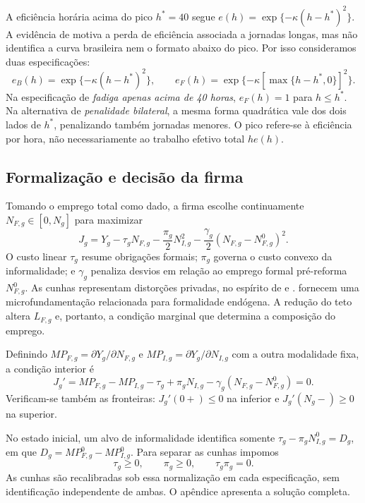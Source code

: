 A eficiência horária acima do pico $h^*=40$ segue $e(h)=\exp\{-\kappa(h-h^*)^2\}$. A evidência de \citet{Pencavel2015} motiva a perda de eficiência associada a jornadas longas, mas não identifica a curva brasileira nem o formato abaixo do pico. Por isso consideramos duas especificações:
\begin{equation}\label{eq:efficiency_modes}
e_B(h)=\exp\{-\kappa(h-h^*)^2\},\qquad
e_F(h)=\exp\{-\kappa[\max\{h-h^*,0\}]^2\}.
\end{equation}
Na especificação de \emph{fadiga apenas acima de 40 horas}, $e_F(h)=1$ para $h\leq h^*$. Na alternativa de \emph{penalidade bilateral}, a mesma forma quadrática vale dos dois lados de $h^*$, penalizando também jornadas menores. O pico refere-se à eficiência por hora, não necessariamente ao trabalho efetivo total $he(h)$.

\subsection{Formalização e decisão da firma}

Tomando o emprego total como dado, a firma escolhe continuamente $N_{F,g}\in[0,N_g]$ para maximizar
\begin{equation}\label{eq:firm}
J_g=Y_g-\tau_g N_{F,g}-\frac{\pi_g}{2}N_{I,g}^2
-\frac{\gamma_g}{2}(N_{F,g}-N_{F,g}^0)^2.
\end{equation}
O custo linear $\tau_g$ resume obrigações formais; $\pi_g$ governa o custo convexo da informalidade; e $\gamma_g$ penaliza desvios em relação ao emprego formal pré-reforma $N_{F,g}^0$. As cunhas representam distorções privadas, no espírito de \citet{HsiehKlenow2009} e \citet{RestucciaRogerson2008}. \citet{DixCarneiroGoldbergMeghirUlyssea2026} fornecem uma microfundamentação relacionada para formalidade endógena. A redução do teto altera $L_{F,g}$ e, portanto, a condição marginal que determina a composição do emprego.

Definindo $MP_{F,g}=\partial Y_g/\partial N_{F,g}$ e $MP_{I,g}=\partial Y_g/\partial N_{I,g}$ com a outra modalidade fixa, a condição interior é
\begin{equation}\label{eq:firm_foc}
J_g'=MP_{F,g}-MP_{I,g}-\tau_g+\pi_g N_{I,g}
-\gamma_g(N_{F,g}-N_{F,g}^0)=0.
\end{equation}
Verificam-se também as fronteiras: $J_g'(0+)\leq0$ na inferior e $J_g'(N_g-)\geq0$ na superior.

No estado inicial, um alvo de informalidade identifica somente $\tau_g-\pi_gN_{I,g}^0=D_g$, em que $D_g=MP_{F,g}^0-MP_{I,g}^0$. Para separar as cunhas impomos
\begin{equation}\label{eq:wedge_normalization}
\tau_g\geq0,\qquad\pi_g\geq0,\qquad\tau_g\pi_g=0.
\end{equation}
As cunhas são recalibradas sob essa normalização em cada especificação, sem identificação independente de ambas. O apêndice apresenta a solução completa.


